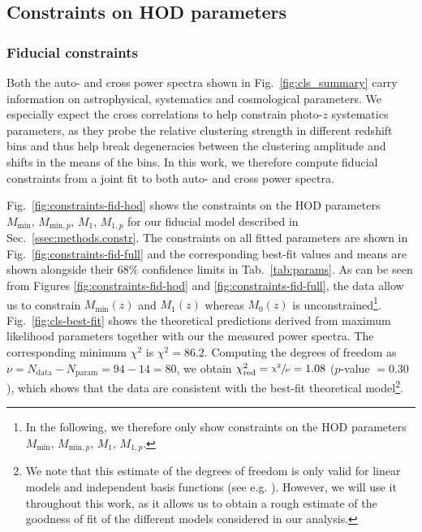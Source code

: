 \documentclass[a4paper,11pt]{article}
\begin{document}
\subsection{Constraints on HOD parameters}\label{ssec:results.hod-constraints}

\subsubsection{Fiducial constraints}\label{sssec:results.hod-constraints.fiducial}

Both the auto- and cross power spectra shown in Fig.~\ref{fig:cls_summary} carry information on astrophysical, systematics and cosmological parameters. We especially expect the cross correlations to help constrain photo-$z$ systematics parameters, as they probe the relative clustering strength in different redshift bins and thus help break degeneracies between the clustering amplitude and shifts in the means of the bins. In this work, we therefore compute fiducial constraints from a joint fit to both auto- and cross power spectra.

Fig.~\ref{fig:constraints-fid-hod} shows the constraints on the HOD parameters $M_{\mathrm{min}}, \allowbreak \, M_{\mathrm{min}, p}, \allowbreak \, M_{1}, \allowbreak \, M_{1, p}$ for our fiducial model described in Sec.~\ref{ssec:methods.constr}. The constraints on all fitted parameters are shown in Fig.~\ref{fig:constraints-fid-full} and the corresponding best-fit values and means are shown alongside their $68 \%$ confidence limits in Tab.~\ref{tab:params}. As can be seen from Figures \ref{fig:constraints-fid-hod} and \ref{fig:constraints-fid-full}, the data allow us to constrain $M_{\mathrm{min}}(z)$ and $M_{1}(z)$ whereas $M_{0}(z)$ is unconstrained\footnote{In the following, we therefore only show constraints on the HOD parameters $M_{\mathrm{min}}, \, M_{\mathrm{min}, p}, \, M_{1}, \, M_{1, p}$.}. Fig.~\ref{fig:cls-best-fit} shows the theoretical predictions derived from maximum likelihood parameters together with our the measured power spectra. The corresponding minimum $\chi^{2}$ is $\chi^{2} = 86.2$. Computing the degrees of freedom as $\nu = N_{\mathrm{data}} - N_{\mathrm{param}} = 94 - 14 = 80$, we obtain $\chi^{2}_{\mathrm{red}} = \sfrac{\chi^{2}}{\nu} = 1.08$ ($p$-value $= 0.30$), which shows that the data are consistent with the best-fit theoretical model\footnote{We note that this estimate of the degrees of freedom is only valid for linear models and independent basis functions (see e.g. \cite{Andrae:2010}). However, we will use it throughout this work, as it allows us to obtain a rough estimate of the goodness of fit of the different models considered in our analysis.}.
\end{document}
